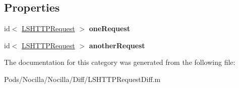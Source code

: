 \subsection*{Properties}
\begin{DoxyCompactItemize}
\item 
\hypertarget{category_l_s_h_t_t_p_request_diff_07_08_a8f4a5c2b4c6520069c8dad450b72f298}{id$<$ \hyperlink{protocol_l_s_h_t_t_p_request-p}{L\-S\-H\-T\-T\-P\-Request} $>$ {\bfseries one\-Request}}\label{category_l_s_h_t_t_p_request_diff_07_08_a8f4a5c2b4c6520069c8dad450b72f298}

\item 
\hypertarget{category_l_s_h_t_t_p_request_diff_07_08_a13482e0afee4cab6c53debbf8bb5e870}{id$<$ \hyperlink{protocol_l_s_h_t_t_p_request-p}{L\-S\-H\-T\-T\-P\-Request} $>$ {\bfseries another\-Request}}\label{category_l_s_h_t_t_p_request_diff_07_08_a13482e0afee4cab6c53debbf8bb5e870}

\end{DoxyCompactItemize}


The documentation for this category was generated from the following file\-:\begin{DoxyCompactItemize}
\item 
Pods/\-Nocilla/\-Nocilla/\-Diff/L\-S\-H\-T\-T\-P\-Request\-Diff.\-m\end{DoxyCompactItemize}
